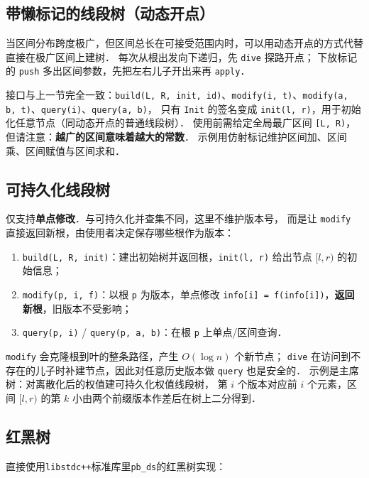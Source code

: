 

\subsection{带懒标记的线段树（动态开点）}

当区间分布跨度极广，但区间总长在可接受范围内时，可以用动态开点的方式代替直接在极广区间上建树．
每次从根出发向下递归，先 {\tt dive} 探路开点；
下放标记的 {\tt push} 多出区间参数，先把左右儿子开出来再 {\tt apply}．

接口与上一节完全一致：{\tt build(L, R, init, id)}、{\tt modify(i, t)}、{\tt modify(a, b, t)}、{\tt query(i)}、{\tt query(a, b)}，
只有 {\tt Init} 的签名变成 {\tt init(l, r)}，用于初始化任意节点（同动态开点的普通线段树）．
使用前需给定全局最广区间 {\tt [L, R)}，但请注意：{\bf 越广的区间意味着越大的常数}．
示例用仿射标记维护区间加、区间乘、区间赋值与区间求和．



\subsection{可持久化线段树}

仅支持{\bf 单点修改}．与可持久化并查集不同，这里不维护版本号，
而是让 {\tt modify} 直接返回新根，由使用者决定保存哪些根作为版本：

\begin{enumerate}[noitemsep]
    \item {\tt build(L, R, init)}：建出初始树并返回根，{\tt init(l, r)} 给出节点 $[l, r)$ 的初始信息；
    \item {\tt modify(p, i, f)}：以根 {\tt p} 为版本，单点修改 {\tt info[i] = f(info[i])}，{\bf 返回新根}，旧版本不受影响；
    \item {\tt query(p, i)} / {\tt query(p, a, b)}：在根 {\tt p} 上单点/区间查询．
\end{enumerate}

{\tt modify} 会克隆根到叶的整条路径，产生 $O(\log n)$ 个新节点；
{\tt dive} 在访问到不存在的儿子时补建节点，因此对任意历史版本做 {\tt query} 也是安全的．
示例是主席树：对离散化后的权值建可持久化权值线段树，
第 $i$ 个版本对应前 $i$ 个元素，区间 $[l, r)$ 的第 $k$ 小由两个前缀版本作差后在树上二分得到．



\subsection{红黑树}

直接使用{\tt libstdc++}标准库里{\tt pb\_ds}的红黑树实现：



\newpage
